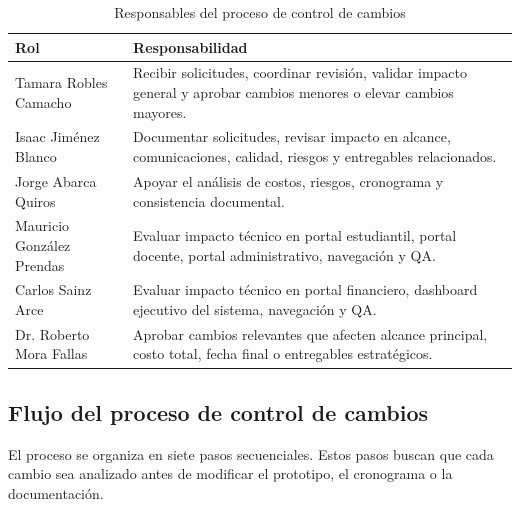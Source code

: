 \documentclass[11pt,spanish]{article}
\begin{document}
\begin{table}[H]
\centering
\caption{Responsables del proceso de control de cambios}
\label{tab:responsables-cambios}
{\small
\begin{tabularx}{\textwidth}{p{4cm} Y}
\toprule
\textbf{Rol} & \textbf{Responsabilidad} \\
\midrule
Tamara Robles Camacho & Recibir solicitudes, coordinar revisión, validar impacto general y aprobar cambios menores o elevar cambios mayores. \\
Isaac Jiménez Blanco & Documentar solicitudes, revisar impacto en alcance, comunicaciones, calidad, riesgos y entregables relacionados. \\
Jorge Abarca Quiros & Apoyar el análisis de costos, riesgos, cronograma y consistencia documental. \\
Mauricio González Prendas & Evaluar impacto técnico en portal estudiantil, portal docente, portal administrativo, navegación y QA. \\
Carlos Sainz Arce & Evaluar impacto técnico en portal financiero, dashboard ejecutivo del sistema, navegación y QA. \\
Dr. Roberto Mora Fallas & Aprobar cambios relevantes que afecten alcance principal, costo total, fecha final o entregables estratégicos. \\
\bottomrule
\end{tabularx}
}
\end{table}

\subsection{Flujo del proceso de control de cambios}

El proceso se organiza en siete pasos secuenciales. Estos pasos buscan que cada cambio sea analizado antes de modificar el prototipo, el cronograma o la documentación.
\end{document}
